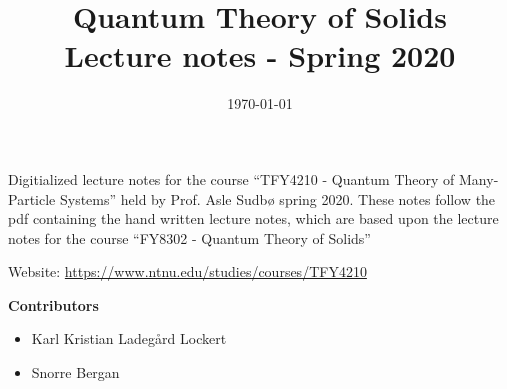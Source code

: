 \documentclass{article}
\title{Quantum Theory of Solids
	\\
Lecture notes - Spring 2020}
\date{\today}
\newcommand{\contribs}{%
\begin{center}
\Large 
\textbf{Contributors}
\end{center}
\begin{itemize}
\item Karl Kristian Ladegård Lockert
\item Snorre Bergan
\end{itemize}}
\begin{document}
\maketitle
Digitialized lecture notes for the course ``TFY4210 - Quantum Theory of Many-Particle Systems'' held by Prof. Asle Sudbø spring 2020. These notes follow the pdf containing the hand written lecture notes, which are based upon the lecture notes for the course ``FY8302 - Quantum Theory of Solids''

Website: \href{https://www.ntnu.edu/studies/courses/TFY4210}{https://www.ntnu.edu/studies/courses/TFY4210}
\contribs
\tableofcontents


% 












\end{document}
